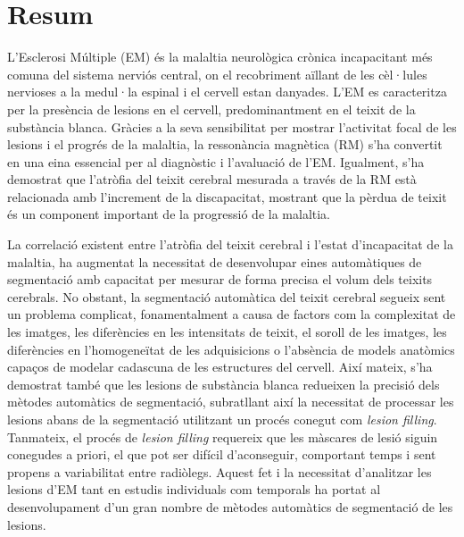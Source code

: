 \chapter*{Resum}


L'Esclerosi Múltiple (EM)  és la malaltia neurològica crònica incapacitant més comuna del sistema nerviós central, on el recobriment aïllant de les cèl·lules nervioses a la medul·la espinal i el cervell estan danyades. L'EM es caracteritza per la presència de lesions en el cervell, predominantment en el teixit de la substància blanca. Gràcies a la seva sensibilitat per mostrar l'activitat focal de les lesions i el progrés de la malaltia, la ressonància magnètica (RM) s'ha convertit en una eina essencial per al diagnòstic i l'avaluació de l'EM. Igualment, s'ha demostrat que l'atròfia del teixit cerebral mesurada a través de la RM està relacionada amb l'increment de la discapacitat, mostrant que la pèrdua de teixit és un component important de la progressió de la malaltia.

La correlació existent entre l'atròfia del teixit cerebral i l'estat d'incapacitat de la malaltia, ha augmentat la necessitat de desenvolupar eines automàtiques de segmentació amb capacitat per mesurar de forma precisa el volum dels teixits cerebrals. No obstant, la segmentació automàtica del teixit cerebral segueix sent un problema complicat, fonamentalment a causa de factors com la complexitat de les imatges, les diferències en les intensitats de teixit, el soroll de les imatges, les diferències en l'homogeneïtat de les adquisicions o l'absència de models anatòmics capaços de modelar cadascuna de les estructures del cervell. Així mateix, s'ha demostrat també que les lesions de substància blanca redueixen la precisió dels mètodes automàtics de segmentació, subratllant així la necessitat de processar les lesions abans de la segmentació utilitzant un procés conegut com \textit{lesion filling}. Tanmateix, el procés de \textit{lesion filling} requereix que les màscares de lesió siguin conegudes a priori, el que pot ser difícil d'aconseguir, comportant temps i sent propens a variabilitat entre radiòlegs. Aquest fet i la necessitat d'analitzar les lesions d'EM tant en estudis individuals com temporals ha portat al desenvolupament d'un gran nombre de mètodes automàtics de segmentació de les lesions.

